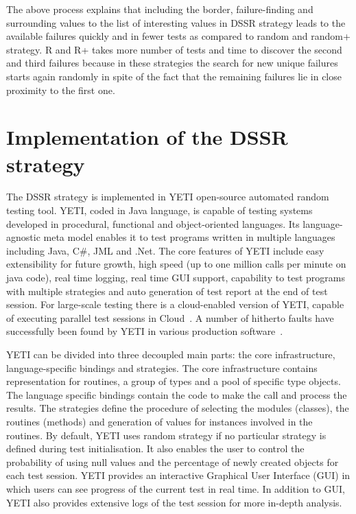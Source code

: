 The above process explains that including the border, failure-finding and surrounding values to the list of interesting values in DSSR strategy leads to the available failures quickly and in fewer tests as compared to random and random+ strategy. R and R+ takes more number of tests and time to discover the second and third failures because in these strategies the search for new unique failures starts again randomly in spite of the fact that the remaining failures lie in close proximity to the first one.




\section{Implementation of the DSSR strategy}\label{sec:imp}

The DSSR strategy is implemented in YETI open-source automated random testing tool. YETI, coded in Java language, is capable of testing systems developed in procedural, functional and object-oriented languages. Its language-agnostic meta model enables it to test programs written in multiple languages including Java, C\#, JML and .Net. The core features of YETI include easy extensibility for future growth, high speed (up to one million calls per minute on java code), real time logging, real time GUI support, capability to test programs with multiple strategies and auto generation of test report at the end of test session. For large-scale testing there is a cloud-enabled version of YETI, capable of executing parallel test sessions in Cloud~\cite{oriol2010yeti}. A number of hitherto faults have successfully been found by YETI in various production software~\cite{Oriol2011, oriol2012random}.

YETI can be divided into three decoupled main parts: the core infrastructure, language-specific bindings and strategies. The core infrastructure contains representation for routines, a group of types and a pool of specific type objects. The language specific bindings contain the code to make the call and process the results. The strategies define the procedure of selecting the modules (classes), the routines (methods) and generation of values for instances involved in the routines. By default, YETI uses random strategy if no particular strategy is defined during test initialisation. It also enables the user to control the probability of using null values and the percentage of newly created objects for each test session. YETI provides an interactive Graphical User Interface (GUI) in which users can see progress of the current test in real time. In addition to GUI, YETI also provides extensive logs of the test session for more in-depth analysis.

